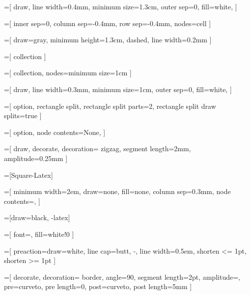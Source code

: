 \newcommand{\true}{\textcolor{green}{\ding{51}}}
\newcommand{\false}{\textcolor{red}{\ding{55}}}

\newcommand{\trueseq}{\tiny \true \, \true \, \true}
\newcommand{\falseseq}{\tiny \false \, \false \, \false}

=[
  draw,
  line width=0.4mm,
  minimum size=1.3cm,
  outer sep=0,
  fill=white,
]

=[
  inner sep=0,
  column sep=-0.4mm,
  row sep=-0.4mm,
  nodes=cell
]

=[
  draw=gray,
  minimum height=1.3cm,
  dashed,
  line width=0.2mm
]

=[
  collection
]

=[
  collection,
  nodes={minimum size=1cm}
]

=[
  draw,
  line width=0.3mm,
  minimum size=1cm,
  outer sep=0,
  fill=white,
]

=[
  option,
  rectangle split,
  rectangle split parts=2,
  rectangle split draw splits=true
]

=[
  option,
  node contents={\small None},
]

=[
  draw,
  decorate,
  decoration={
    zigzag,
    segment length=2mm,
    amplitude=0.25mm
  }
]

=[Square-Latex]


\newcommand{\ellipsis}[1][15mm]{ \node [ellipsis=#1]; }
\newcommand{\vellipsis}[1][15mm]{ \node [vertical ellipsis=#1]; }

=[
  minimum width=2em,
  draw=none,
  fill=none,
  column sep=0.3mm,
  node contents={,}
]

\newcommand{\tuplecomma}{ \node [tuple comma]; }

=[draw=black, -latex]

=[
  font=\small,
  fill=white!0
]

=[
  preaction={draw=white, line cap=butt, -, line width=0.5em},
  shorten <= 1pt,
  shorten >= 1pt
]

=[
  decorate,
  decoration={
    border, angle=90, segment length=2pt, amplitude=\pgflinewidth,
    pre=curveto, pre length=0, post=curveto, post length=5mm
  }
]

